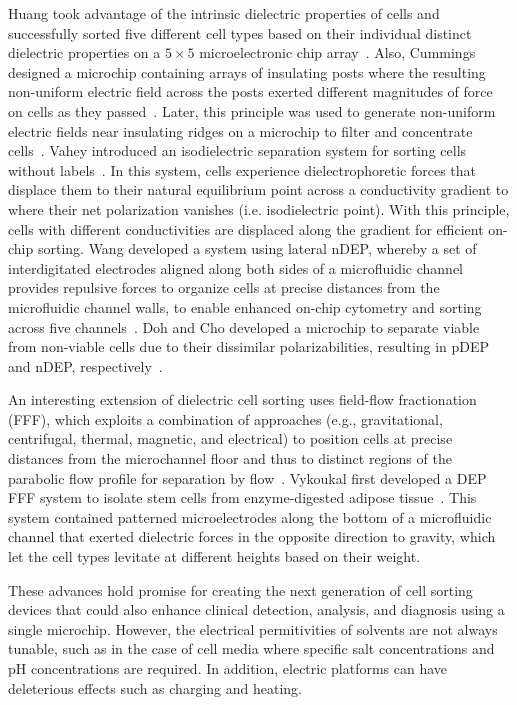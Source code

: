 Huang \etal{} took advantage of the intrinsic dielectric properties of cells and successfully sorted five different cell types based on their individual distinct dielectric properties on a $5 \times 5$ microelectronic chip array~\cite{Huang2002}. Also, Cummings \etal{} designed a microchip containing arrays of insulating posts where the resulting non-uniform electric field across the posts exerted different magnitudes of force on cells as they passed~\cite{Cummings2003}. Later, this principle was used to generate non-uniform electric fields near insulating ridges on a microchip to filter and concentrate cells~\cite{Barrett2005}. Vahey \etal{} introduced an isodielectric separation system for sorting cells without labels~\cite{Vahey2008}. In this system, cells experience dielectrophoretic forces that displace them to their natural equilibrium point across a conductivity gradient to where their net polarization vanishes (i.e. isodielectric point). With this principle, cells with different conductivities are displaced along the gradient for efficient on-chip sorting. Wang \etal{} developed a system using lateral nDEP, whereby a set of interdigitated electrodes aligned along both sides of a microfluidic channel provides repulsive forces to organize cells at precise distances from the microfluidic channel walls, to enable enhanced on-chip cytometry and sorting across five channels~\cite{Wang2007}. Doh and Cho developed a microchip to separate viable from non-viable cells due to their dissimilar polarizabilities, resulting in pDEP and nDEP, respectively~\cite{Doh2005}.

An interesting extension of dielectric cell sorting uses field-flow fractionation (FFF), which exploits a combination of approaches (e.g., gravitational, centrifugal, thermal, magnetic, and electrical) to position cells at precise distances from the microchannel floor and thus to distinct regions of the parabolic flow profile for separation by flow~\cite{Roda2009}. Vykoukal \etal{} first developed a DEP FFF system to isolate stem cells from enzyme-digested adipose tissue~\cite{Vykoukal2008}. This system contained patterned microelectrodes along the bottom of a microfluidic channel that exerted dielectric forces in the opposite direction to gravity, which let the cell types levitate at different heights based on their weight.

These advances hold promise for creating the next generation of cell sorting devices that could also enhance clinical detection, analysis, and diagnosis using a single microchip. However, the electrical permitivities of solvents are not always tunable, such as in the case of cell media where specific salt concentrations and pH concentrations are required. In addition, electric platforms can have deleterious effects such as charging and heating.


